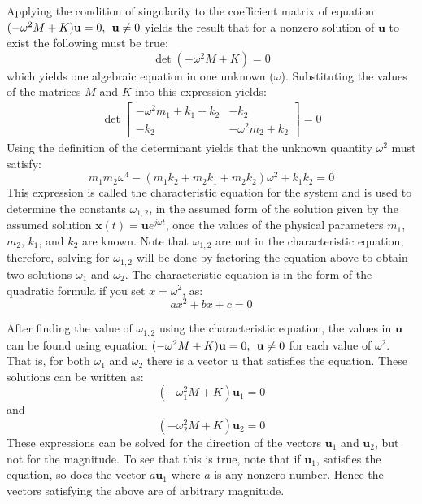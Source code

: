 \documentclass[12pt,letter]{article}
\numberwithin{ex}{section} %
\numberwithin{re}{section} %
\begin{document}
Applying the condition of singularity to the coefficient matrix of equation $(-\omega^2 M  + K)\mathbf{u} =0, \hspace{1ex} \mathbf{u}\neq0$ yields the result that for a nonzero solution of $\mathbf{u}$ to exist the following must be true:
\begin{equation}
\det(-\omega^2 M  + K) = 0
\end{equation}
which yields one algebraic equation in one unknown ($\omega$). Substituting the values of the matrices $M$ and $K$ into this expression yields:
\begin{eqnarray}
\det\begin{bmatrix} -\omega^2 m_1 + k_1 + k_2 & -k_2  \\  -k_2 & -\omega^2 m_2 + k_2 \end{bmatrix}=0
\end{eqnarray}
Using the definition of the determinant yields that the unknown quantity $\omega^2$ must satisfy:
\begin{equation}
m_1 m_2 \omega^4 - (m_1 k_2 + m_2 k_1 + m_2 k_2)\omega^2 + k_1 k_2 = 0
\end{equation}
This expression is called the characteristic equation for the system and is used to determine the constants $\omega_{1,2}$, in the assumed form of the solution given by the assumed solution $\mathbf{x}(t) = \mathbf{u}e^{j\omega t}$, once the values of the physical parameters $m_1$, $m_2$, $k_1$, and $k_2$ are known. Note that $\omega_{1,2}$ are not in the characteristic equation, therefore, solving for $\omega_{1,2}$  will be done by factoring the equation above to obtain two solutions $\omega_1$ and $\omega_2$. The characteristic equation is in the form of the quadratic formula if you set $x=\omega^2$, as:
\begin{equation}
ax^2 + bx +c = 0
\end{equation}

After finding the value of $\omega_{1,2}$ using the characteristic equation, the values in $\mathbf{u}$ can be found using equation $(-\omega^2 M  + K)\mathbf{u} =0, \hspace{1ex} \mathbf{u}\neq0$ for each value of $\omega^2$. That is, for both $\omega_1$ and $\omega_2$ there is a vector  $\mathbf{u}$ that satisfies the equation. These solutions can be written as:
\begin{equation}
	(-\omega_1^2 M  + K)\mathbf{u}_1 =0
\end{equation}
and 
\begin{equation}
	(-\omega_2^2 M  + K)\mathbf{u}_2 =0
\end{equation}
These expressions can be solved for the direction of the vectors $\mathbf{u}_1$ and $\mathbf{u}_2$, but not for the magnitude. To see that this is true, note that if $\mathbf{u}_1$, satisfies the equation, so does the vector $a\mathbf{u}_1$ where $a$ is any nonzero number. Hence the vectors satisfying the above are of arbitrary magnitude.
 
\end{document}
